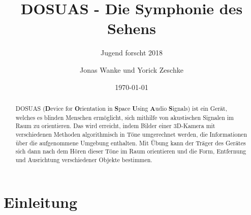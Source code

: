 \documentclass[a4paper,12pt,ngerman]{scrartcl}
\title{DOSUAS - Die Symphonie des Sehens}
\subtitle{Jugend forscht 2018}
\author{Jonas Wanke und Yorick Zeschke}
\date{\today}
\begin{document}
\maketitle


\begin{abstract}
	DOSUAS (\textbf{D}evice for \textbf{O}rientation in \textbf{S}pace \textbf{U}sing 
	\textbf{A}udio \textbf{S}ignals) ist ein Gerät, welches es blinden Menschen ermöglicht,
	sich mithilfe von akustischen Signalen im Raum zu orientieren. Das wird erreicht, indem Bilder 
	einer 3D-Kamera mit verschiedenen Methoden algorithmisch in Töne umgerechnet werden,
	die Informationen über die aufgenommene Umgebung enthalten. Mit Übung kann der Träger des Gerätes 
	sich dann nach dem Hören dieser Töne im Raum orientieren und die Form, Entfernung und Ausrichtung 
	verschiedener Objekte bestimmen.
\end{abstract}

\tableofcontents

\newpage

\section{Einleitung}
\end{document}
